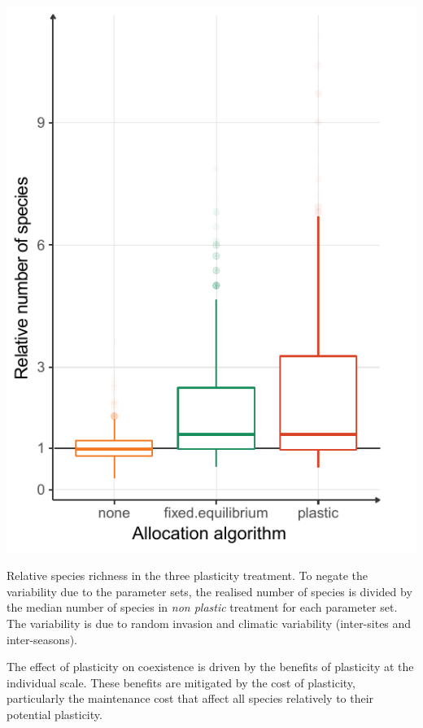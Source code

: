 \begin{marginfigure}\label{fig:species_richness}
\includegraphics[]{./2_PP/Figures/Comm/comm_n_sp_differences.pdf}
\caption[Relative species richness in plasticity treatments]{Relative species richness in the three plasticity treatment. To negate the variability due to the parameter sets, the realised number of species is divided by the median number of species in \textit{non plastic} treatment for each parameter set. The variability is due to random invasion and climatic variability (inter-sites and inter-seasons).}
\end{marginfigure}

The effect of plasticity on coexistence is driven by the benefits of plasticity at the individual scale. These benefits are mitigated by the cost of plasticity, particularly the maintenance cost that affect all species relatively to their potential plasticity.



